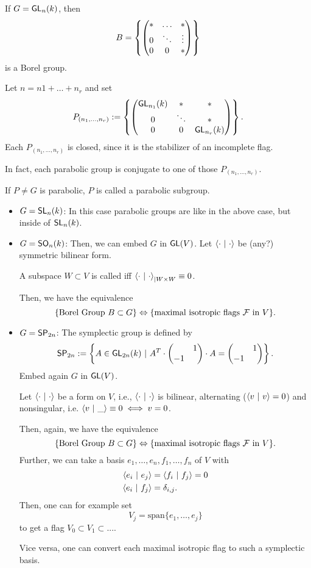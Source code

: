 \begin{example}
	If $G  = \textsf{GL}_n(k)$, then
	\[ B = \left\lbrace\left(\begin{matrix} * & \ldots & * \\
	0 & \ddots & \vdots\\
 0  & 0 & *  \end{matrix}\right)\right\rbrace \]
is a Borel group.


Let $n = n1 + \ldots + n_r$ and set
\[ P_{(n_1,\ldots, n_r)} := 
\left\lbrace
\left(\begin{matrix} \textsf{GL}_{n_1}(k) & * & * \\
	0 & \ddots & *\\
	0  & 0 & \textsf{GL}_{n_r}(k)  \end{matrix}\right)
\right\rbrace.
 \]
 Each $P_{(n_1,\ldots, n_r)}$ is closed, since it is the stabilizer of an incomplete flag.
 
 In fact, each parabolic group is conjugate to one of those $P_{(n_1,\ldots, n_r)}$.
 
 If $P \neq G$ is parabolic, $P$ is called a  parabolic subgroup.
\end{example}

\begin{example}
	\begin{itemize}
		\item $G = \textsf{SL}_n(k)$: In this case parabolic groups are like in the above case, but inside of $\textsf{SL}_n(k)$.
		\item $G = \textsf{SO}_n(k)$: Then, we can embed $G$ in $\textsf{GL}(V)$. Let $\left<\cdot ~ | ~ \cdot\right>$ be (any?) symmetric bilinear form.
		
		A subspace $W \subset V$ is called  iff $\left<\cdot ~ | ~ \cdot\right>_{|W\times W} \equiv 0$.
		
		Then, we have the equivalence
		\[ \left\lbrace \text{Borel Group } B \subset G \right\rbrace \Leftrightarrow \{ \text{maximal isotropic flags }\mathcal{F} \text{ in }V \}. \]
		\item $G = \textsf{SP}_{2n}$: The symplectic group is defined by
		\[ \textsf{SP}_{2n} := \left\lbrace A \in \textsf{GL}_{2n}(k)  ~ | ~  A^T \cdot \left(\begin{matrix}  & 1\\ - 1 &  \end{matrix}\right) \cdot A = \left(\begin{matrix}  & 1\\ - 1 &  \end{matrix}\right) \right\rbrace. \]
		Embed again $G$ in $\textsf{GL}(V)$.
		
		Let $\left<\cdot ~ | ~ \cdot\right>$ be a  form on $V$, i.e., $\left<\cdot ~ | ~ \cdot\right>$ is bilinear, alternating ($\left<v ~ | ~ v\right>= 0$) and nonsingular, i.e. $\left<v ~ | ~ \_\right> \equiv 0 \iff v = 0$.
		
		Then, again, we have the equivalence
		\[ \left\lbrace \text{Borel Group } B \subset G \right\rbrace \Leftrightarrow \{ \text{maximal isotropic flags }\mathcal{F} \text{ in }V \}. \]
		Further, we can take a basis $e_1,\ldots, e_n, f_1,\ldots, f_n$ of $V$ with
		\begin{align*}
		\left<e_i ~ | ~ e_j\right> &= \left<f_i ~ | ~ f_j\right> = 0\\
		\left<e_i ~ | ~ f_j\right> &= \delta_{i,j}.
		\end{align*}
		Then, one can for example set
		\[V_j = \mathrm{span}\{e_1,\ldots, e_j\} \]
		to get a flag $V_0 \subset V_1 \subset ...$.
		
		Vice versa, one can convert each maximal isotropic flag to such a symplectic basis.
	\end{itemize}
\end{example}